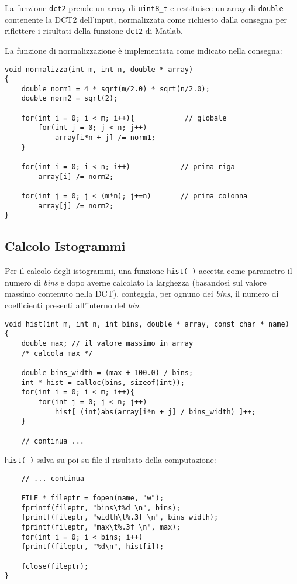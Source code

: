 \documentclass[11pt,a4paper]{scrartcl}
\begin{document}
La funzione \texttt{dct2} prende un array di \texttt{uint8\_t} e restituisce un array di \texttt{double} contenente la DCT2 dell'input, normalizzata come richiesto dalla consegna per riflettere i risultati della funzione \texttt{dct2} di Matlab.

La funzione di normalizzazione è implementata come indicato nella consegna:

\begin{verbatim}
void normalizza(int m, int n, double * array)
{
    double norm1 = 4 * sqrt(m/2.0) * sqrt(n/2.0);
    double norm2 = sqrt(2);
    
    for(int i = 0; i < m; i++){            // globale
        for(int j = 0; j < n; j++)
            array[i*n + j] /= norm1;     
    }

    for(int i = 0; i < n; i++)            // prima riga
        array[i] /= norm2;

    for(int j = 0; j < (m*n); j+=n)       // prima colonna
        array[j] /= norm2;
}
\end{verbatim}

\subsection*{Calcolo Istogrammi}
Per il calcolo degli istogrammi, una funzione \texttt{hist( )} accetta come parametro il numero di \emph{bins} e dopo averne calcolato la larghezza (basandosi sul valore massimo contenuto nella DCT), conteggia, per ognuno dei \emph{bins}, il numero di coefficienti presenti all'interno del \emph{bin}.

\begin{verbatim}
void hist(int m, int n, int bins, double * array, const char * name)
{
    double max; // il valore massimo in array
    /* calcola max */
   
    double bins_width = (max + 100.0) / bins;
    int * hist = calloc(bins, sizeof(int));
    for(int i = 0; i < m; i++){
        for(int j = 0; j < n; j++)
	        hist[ (int)abs(array[i*n + j] / bins_width) ]++;
    }

    // continua ...
\end{verbatim}

\texttt{hist( )} salva su poi su file il risultato della computazione:
\begin{verbatim}
    // ... continua
   
    FILE * fileptr = fopen(name, "w");
    fprintf(fileptr, "bins\t%d \n", bins);
    fprintf(fileptr, "width\t%.3f \n", bins_width);
    fprintf(fileptr, "max\t%.3f \n", max);
    for(int i = 0; i < bins; i++)
	fprintf(fileptr, "%d\n", hist[i]);

    fclose(fileptr);
}
\end{verbatim}
\end{document}
